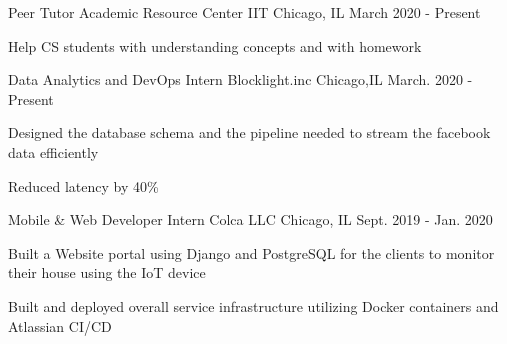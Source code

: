 

\begin{cventries}
  \cventry
    {Peer Tutor} %
    {Academic Resource Center IIT} %
    {Chicago, IL} %
    {March 2020 - Present} %
    {
      \begin{cvitems} %
        \item {Help CS students with understanding concepts and with homework}
      \end{cvitems}
    }
  \cventry
    {Data Analytics and DevOps Intern} %
    {Blocklight.inc} %
    {Chicago,IL} %
    {March. 2020 - Present} %
    {
      \begin{cvitems} %
        \item {Designed the database schema and the pipeline needed to stream the facebook data efficiently}
        \item {Reduced latency by 40\%}
      \end{cvitems}
    }

  \cventry
    {Mobile \& Web Developer Intern} %
    {Colca LLC} %
    {Chicago, IL} %
    {Sept. 2019 - Jan. 2020} %
    {
      \begin{cvitems} %
        \item {Built a Website portal using Django and PostgreSQL for the clients to monitor their house using the IoT device}
        \item {Built and deployed overall service infrastructure utilizing Docker containers and Atlassian CI/CD}
      \end{cvitems}
    }


\end{cventries}
